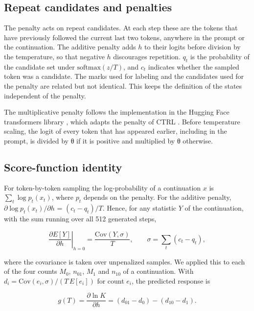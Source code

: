 \documentclass[aps,prx,onecolumn,superscriptaddress,longbibliography]{revtex4-2}
\begin{document}
\subsection{Repeat candidates and penalties}

The penalty acts on repeat candidates. At each step these are the tokens that have previously followed the current last two tokens, anywhere in the prompt or the continuation. The additive penalty adds \(h\) to their logits before division by the temperature, so that negative \(h\) discourages repetition. \(q_{t}\) is the probability of the candidate set under \(\mathrm{softmax}(z/T)\), and \(c_{t}\) indicates whether the sampled token was a candidate. The marks used for labeling and the candidates used for the penalty are related but not identical. This keeps the definition of the states independent of the penalty.

The multiplicative penalty follows the implementation in the Hugging Face transformers library \cite{1910.03771}, which adapts the penalty of CTRL \cite{1909.05858}. Before temperature scaling, the logit of every token that has appeared earlier, including in the prompt, is divided by θ if it is positive and multiplied by θ otherwise.

\subsection{Score-function identity}

For token-by-token sampling the log-probability of a continuation \(x\) is \(\sum_t \log p_t(x_t)\), where \(p_{t}\) depends on the penalty. For the additive penalty, \(\partial\log p_t(x_t)/\partial h\) = \((c_t-q_t)/T\). Hence, for any statistic \(Y\) of the continuation, with the sum running over all 512 generated steps,

\begin{equation}\left.\frac{\partial E[Y]}{\partial h}\right|_{h=0}=\frac{\mathrm{Cov}(Y,\sigma)}{T},\qquad \sigma=\sum_t (c_t-q_t),\end{equation}

where the covariance is taken over unpenalized samples. We applied this to each of the four counts \(M_{0}\), \(n_{01}\), \(M_{1}\) and \(n_{10}\) of a continuation. With \(d_i=\mathrm{Cov}(e_i,\sigma)/(T\,E[e_i])\) for count \(e_{i}\), the predicted response is

\begin{equation}g(T)=\frac{\partial \ln K}{\partial h}=(d_{01}-d_0)-(d_{10}-d_1).\end{equation}
\end{document}

